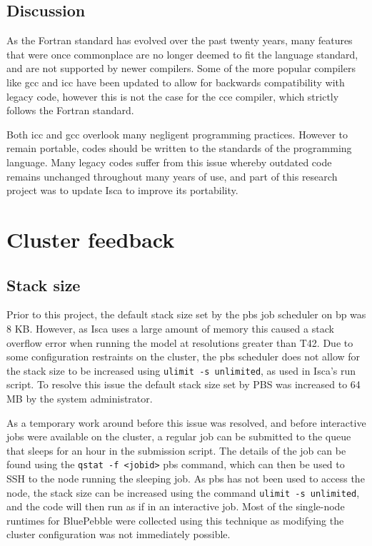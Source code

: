 \documentclass[a4paper,11pt]{report}
\begin{document}
\subsection{Discussion}
As the Fortran standard has evolved over the past twenty years, many features that were once commonplace are no longer deemed to fit the language standard, and are not supported by newer compilers. Some of the more popular compilers like \gls{gcc} and \gls{icc} have been updated to allow for backwards compatibility with legacy code, however this is not the case for the \gls{cce} compiler, which strictly follows the Fortran standard.
\par
Both \gls{icc} and \gls{gcc} overlook many negligent programming practices. However to remain portable, codes should be written to the standards of the programming language. Many legacy codes suffer from this issue whereby outdated code remains unchanged throughout many years of use, and part of this research project was to update Isca to improve its portability.


\section{Cluster feedback}
\subsection{Stack size}
Prior to this project, the default stack size set by the \gls{pbs} job scheduler on \gls{bp} was 8 KB. However, as Isca uses a large amount of memory this caused a stack overflow error when running the model at resolutions greater than T42. Due to some configuration restraints on the cluster, the \gls{pbs} scheduler does not allow for the stack size to be increased using \texttt{ulimit -s unlimited}, as used in Isca's run script. To resolve this issue the default stack size set by PBS was increased to 64 MB by the system administrator.
\par
As a temporary work around before this issue was resolved, and before interactive jobs were available on the cluster, a regular job can be submitted to the queue that sleeps for an hour in the submission script. The details of the job can be found using the  \texttt{qstat -f <jobid>} \gls{pbs} command, which can then be used to SSH to the node running the sleeping job. As \gls{pbs} has not been used to access the node, the stack size can be increased using the command \texttt{ulimit -s unlimited}, and the code will then run as if in an interactive job. Most of the single-node runtimes for BluePebble were collected using this technique as modifying the cluster configuration was not immediately possible. 
\end{document}
